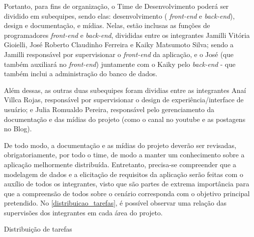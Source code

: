 Portanto, para fins de organização, o Time de Desenvolvimento poderá ser dividido em subequipes, sendo elas: desenvolvimento ( \textsl{\gls{front-end}} e \textsl{\gls{back-end}}), design e documentação, e mídias. Nelas, estão inclusas as funções de programadores \textsl{\gls{front-end}} e \textsl{\gls{back-end}}, divididas entre os integrantes Jamilli Vitória Gioielli, José Roberto Claudinho Ferreira e Kaiky Matsumoto Silva; sendo a Jamilli responsável por supervisionar o \textsl{\gls{front-end}} da aplicação, e o José (que também auxiliará no \textsl{\gls{front-end}}) juntamente com o Kaiky pelo \textsl{\gls{back-end}} - que também inclui a administração do banco de dados. 

Além dessas, as outras duas subequipes foram dividias entre as integrantes Anaí Villca Rojas, responsável  por supervisionar o design de experiência/interface de usuário; e Julia Romualdo Pereira, responsável pelo gerenciamento da documentação e das mídias do projeto (como o canal no \gls{youtube} e as postagens no Blog). 

 De todo modo, a documentação e as mídias do projeto deverão ser revisadas, obrigatoriamente, por todo o time, de modo a manter um conhecimento sobre a aplicação melhormente distribuída. Entretanto, precisa-se compreender que a modelagem de dados e a elicitação de requisitos da aplicação serão feitas com o auxílio de todos os integrantes, visto que são partes de extrema importância para que a compreensão de todos sobre o cenário corresponda com o objetivo principal pretendido. No \autoref{distribuicao_tarefas}, é possível observar uma relação das supervisões dos integrantes em cada área do projeto. 

\begin{quadro}[htb]
\centering
\ABNTEXfontereduzida
\caption{Distribuição de tarefas}
\label{distribuicao_tarefas}
\end{quadro}
\FloatBarrier 

